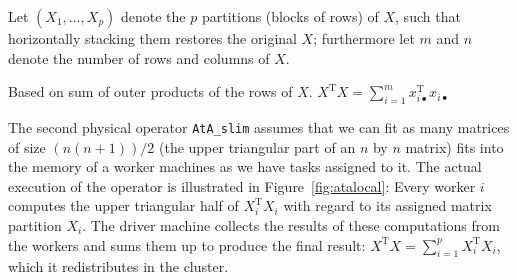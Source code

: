 \documentclass{article}
\begin{document}
Let $(X_1,\dots,X_p)$ denote the $p$ partitions (blocks of rows) of $X$, such that horizontally stacking them restores the original $X$; furthermore let $m$ and $n$ denote the number of rows and columns of $X$.

Based on sum of outer products of the rows of $X$. $X^\mathrm{T}X = \sum_{i=1}^{m} x_{i\bullet}^\mathrm{T} x_{i\bullet}$ 

The second physical operator \texttt{AtA\_slim} assumes that we can fit as many matrices of size $(n(n+1))/2$ (the upper triangular part of an $n$ by $n$ matrix) fits into the memory of a worker machines as we have tasks assigned to it. The actual execution of the operator is illustrated in Figure~\ref{fig:atalocal}: Every worker $i$ computes the upper triangular half of $X_i^\mathrm{T}X_i$ with regard to its assigned matrix partition $X_i$. The driver machine collects the results of these computations from the workers and sums them up to produce the final result: $X^\mathrm{T}X = \sum_{i = 1}^{p} X_i^\mathrm{T}X_i$, which it redistributes in the cluster.
\end{document}
